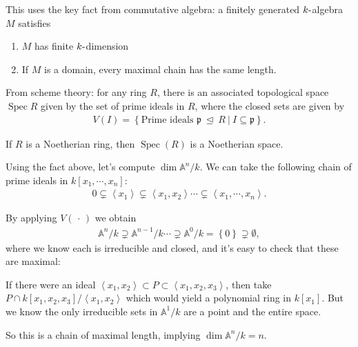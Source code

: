 \begin{remark}

This uses the key fact from commutative algebra: a finitely generated
\(k{\hbox{-}}\)algebra \(M\) satisfies

\begin{enumerate}
\def\labelenumi{\arabic{enumi}.}
\tightlist
\item
  \(M\) has finite \(k{\hbox{-}}\)dimension
\item
  If \(M\) is a domain, every maximal chain has the same length.
\end{enumerate}

\end{remark}

\begin{remark}

From scheme theory: for any ring \(R\), there is an associated
topological space \(\operatorname{Spec}R\) given by the set of prime
ideals in \(R\), where the closed sets are given by
\begin{align*}  
V(I) = \left\{{\text{Prime ideals } {\mathfrak{p}}{~\trianglelefteq~}R {~\mathrel{\Big|}~}I\subseteq {\mathfrak{p}}}\right\}
.\end{align*}

If \(R\) is a Noetherian ring, then \(\operatorname{Spec}(R)\) is a
Noetherian space.

\end{remark}

\begin{example}

Using the fact above, let's compute \(\dim {\mathbb{A}}^n/k\). We can
take the following chain of prime ideals in \(k[x_1, \cdots, x_{n}]\):
\begin{align*}  
0 \subsetneq \left\langle{x_1}\right\rangle \subsetneq \left\langle{x_1, x_2}\right\rangle \cdots \subsetneq \left\langle{x_1, \cdots, x_n}\right\rangle
.\end{align*}

By applying \(V({\,\cdot\,})\) we obtain
\begin{align*}  
{\mathbb{A}}^n/k \supsetneq {\mathbb{A}}^{n-1}/k \cdots \supsetneq {\mathbb{A}}^0/k = \left\{{0}\right\} \supsetneq \emptyset
,\end{align*}
where we know each is irreducible and closed, and it's easy to check
that these are maximal:

If there were an ideal
\(\left\langle{x_1, x_2}\right\rangle \subset P \subset \left\langle{x_1, x_2, x_3}\right\rangle\),
then take
\(P\cap k[x_1, x_2, x_3] / \left\langle{x_1, x_2}\right\rangle\) which
would yield a polynomial ring in \(k[x_1]\). But we know the only
irreducible sets in \({\mathbb{A}}^1/k\) are a point and the entire
space.

So this is a chain of maximal length, implying
\(\dim {\mathbb{A}}^n/k = n\).

\end{example}

